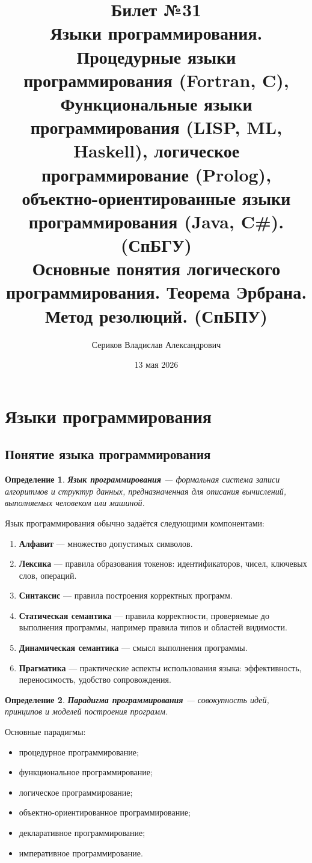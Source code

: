 \documentclass[12pt,a4paper]{article}
\title{Билет №31 \\ \small Языки программирования. Процедурные языки программирования (Fortran, C), Функциональные языки программирования (LISP, ML, Haskell), логическое программирование (Prolog), объектно-ориентированные языки программирования (Java, C\#). (СпБГУ) \\ Основные понятия логического программирования. Теорема Эрбрана. Метод резолюций. (СпБПУ)}
\author{Сериков Владислав Александрович}
\date{13 мая 2026}
\newtheorem{definition}{Определение}
\begin{document}
\maketitle
\tableofcontents
\newpage

\section{Языки программирования}

\subsection{Понятие языка программирования}

\begin{definition}
\textbf{Язык программирования} --- формальная система записи алгоритмов и структур данных, предназначенная для описания вычислений, выполняемых человеком или машиной.
\end{definition}

Язык программирования обычно задаётся следующими компонентами:
\begin{enumerate}
    \item \textbf{Алфавит} --- множество допустимых символов.
    \item \textbf{Лексика} --- правила образования токенов: идентификаторов, чисел, ключевых слов, операций.
    \item \textbf{Синтаксис} --- правила построения корректных программ.
    \item \textbf{Статическая семантика} --- правила корректности, проверяемые до выполнения программы, например правила типов и областей видимости.
    \item \textbf{Динамическая семантика} --- смысл выполнения программы.
    \item \textbf{Прагматика} --- практические аспекты использования языка: эффективность, переносимость, удобство сопровождения.
\end{enumerate}

\begin{definition}
\textbf{Парадигма программирования} --- совокупность идей, принципов и моделей построения программ.
\end{definition}

Основные парадигмы:
\begin{itemize}
    \item процедурное программирование;
    \item функциональное программирование;
    \item логическое программирование;
    \item объектно-ориентированное программирование;
    \item декларативное программирование;
    \item императивное программирование.
\end{itemize}
\end{document}
